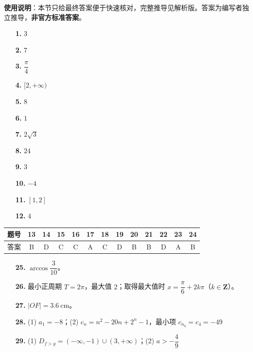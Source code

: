 
\begin{gknotice}
\textbf{使用说明}：本节只给最终答案便于快速核对，完整推导见解析版。答案为编写者独立推导，\textbf{非官方标准答案}。
\end{gknotice}

\begin{itemize}[leftmargin=2.6em]
  \item[\textbf{1.}] \(3\)
  \item[\textbf{2.}] \(7\)
  \item[\textbf{3.}] \(\dfrac{\pi}{4}\)
  \item[\textbf{4.}] \([2,+\infty)\)
  \item[\textbf{5.}] \(8\)
  \item[\textbf{6.}] \(1\)
  \item[\textbf{7.}] \(2\sqrt{3}\)
  \item[\textbf{8.}] \(24\)
  \item[\textbf{9.}] \(3\)
  \item[\textbf{10.}] \(-4\)
  \item[\textbf{11.}] \([1,2]\)
  \item[\textbf{12.}] \(4\)
\end{itemize}

\begin{center}\begin{tabular}{ccccccccccccc}
\toprule
题号 & 13 & 14 & 15 & 16 & 17 & 18 & 19 & 20 & 21 & 22 & 23 & 24 \\
\midrule
答案 & B & D & C & C & A & C & D & B & B & D & A & B \\
\bottomrule
\end{tabular}\end{center}

\begin{itemize}[leftmargin=2.6em]
  \item[\textbf{25.}] \(\arccos\dfrac{3}{10}\)。
  \item[\textbf{26.}] 最小正周期 \(T=2\pi\)，最大值 \(2\)；取得最大值时 \(x=\dfrac{\pi}{6}+2k\pi\)（\(k\in\mathbf{Z}\)）。
  \item[\textbf{27.}] \(|OF|=3.6\ \mathrm{cm}\)。
  \item[\textbf{28.}] (1) \(a_{1}=-8\)；(2) \(c_{n}=n^{2}-20n+2^{n}-1\)，最小项 \(c_{n_{0}}=c_{4}=-49\)
  \item[\textbf{29.}] (1) \(D_{f>g}=(-\infty,-1)\cup(3,+\infty)\)；(2) \(a>-\dfrac{4}{9}\)
\end{itemize}

